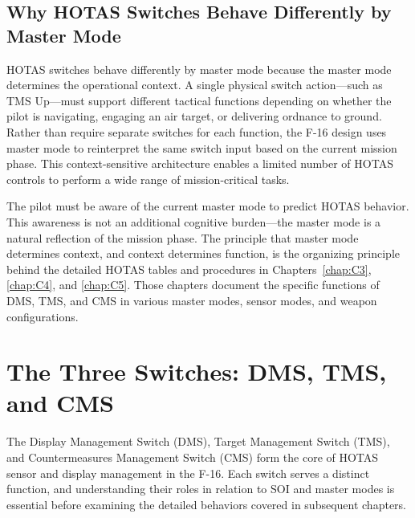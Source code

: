 \documentclass[11pt, a4paper, twoside]{report}
\begin{document}

\subsection{Why HOTAS Switches Behave Differently by Master Mode}
\label{sec:C2-S2-S2}

HOTAS switches behave differently by master mode because the master mode determines the operational context. A single physical switch action—such as TMS Up—must support different tactical functions depending on whether the pilot is navigating, engaging an air target, or delivering ordnance to ground. Rather than require separate switches for each function, the F-16 design uses master mode to reinterpret the same switch input based on the current mission phase. This context-sensitive architecture enables a limited number of HOTAS controls to perform a wide range of mission-critical tasks.

The pilot must be aware of the current master mode to predict HOTAS behavior. This awareness is not an additional cognitive burden—the master mode is a natural reflection of the mission phase. The principle that master mode determines context, and context determines function, is the organizing principle behind the detailed HOTAS tables and procedures in Chapters~\ref{chap:C3}, \ref{chap:C4}, and \ref{chap:C5}. Those chapters document the specific functions of DMS, TMS, and CMS in various master modes, sensor modes, and weapon configurations.


\section{The Three Switches: DMS, TMS, and CMS}
\label{sec:C2-S3}

The Display Management Switch (DMS), Target Management Switch (TMS), and Countermeasures Management Switch (CMS) form the core of HOTAS sensor and display management in the F-16. Each switch serves a distinct function, and understanding their roles in relation to SOI and master modes is essential before examining the detailed behaviors covered in subsequent chapters.
\end{document}

